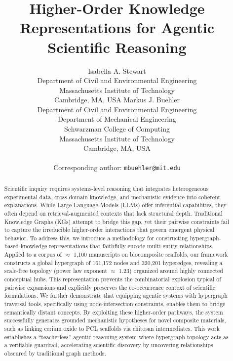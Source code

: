 \documentclass{article}
\title{\bf Higher-Order Knowledge Representations for Agentic Scientific Reasoning}
\author{
    Isabella A. Stewart \\
    Department of Civil and Environmental Engineering \\
    Massachusetts Institute of Technology \\
    Cambridge, MA, USA
\And
    Markus J. Buehler \\
    Department of Civil and Environmental Engineering \\
    Department of Mechanical Engineering \\
    Schwarzman College of Computing \\
    Massachusetts Institute of Technology \\
    Cambridge, MA, USA \\
    \\
    Corresponding author: \texttt{mbuehler@mit.edu}
}
\begin{document}
\raggedbottom
\maketitle

\begin{abstract}

Scientific inquiry requires systems-level reasoning that integrates heterogeneous experimental data, cross-domain knowledge, and mechanistic evidence into coherent explanations. While Large Language Models (LLMs) offer inferential capabilities, they often depend on retrieval-augmented contexts that lack structural depth. Traditional Knowledge Graphs (KGs) attempt to bridge this gap, yet their pairwise constraints fail to capture the irreducible higher-order interactions that govern emergent physical behavior. To address this, we introduce a methodology for constructing hypergraph-based knowledge representations that faithfully encode multi-entity relationships. Applied to a corpus of $\approx$ 1,100 manuscripts on biocomposite scaffolds, our framework constructs a global hypergraph of 161,172 nodes and 320,201 hyperedges, revealing a scale-free topology (power law exponent $\approx$ 1.23) organized around highly connected conceptual hubs. This representation prevents the combinatorial explosion typical of pairwise expansions and explicitly preserves the co-occurrence context of scientific formulations. We further demonstrate that equipping agentic systems with hypergraph traversal tools, specifically using node-intersection constraints, enables them to bridge semantically distant concepts. By exploiting these higher-order pathways, the system successfully generates grounded mechanistic hypotheses for novel composite materials, such as linking cerium oxide to PCL scaffolds via chitosan intermediates. This work establishes a ``teacherless'' agentic reasoning system where hypergraph topology acts as a verifiable guardrail, accelerating scientific discovery by uncovering relationships obscured by traditional graph methods.


\color{black}
\end{abstract}

\end{document}
